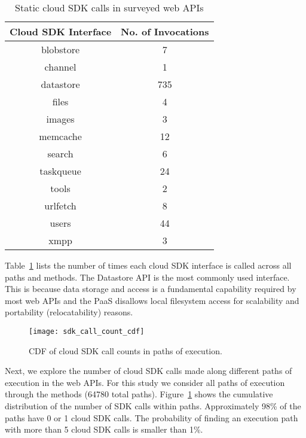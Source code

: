 \begin{table}[htdp]
\caption{Static cloud SDK calls in surveyed web APIs
\label{tab:sdk_call_counts}
}
\begin{center}
\begin{tabular}{|c|c|}
\hline
Cloud SDK Interface & No. of Invocations \\ \hline
blobstore & 7 \\ \hline
channel & 1 \\ \hline
datastore & 735 \\ \hline
files & 4 \\ \hline
images & 3 \\ \hline
memcache & 12 \\ \hline
search & 6 \\ \hline
taskqueue & 24 \\ \hline
tools & 2 \\ \hline
urlfetch & 8 \\ \hline
users & 44 \\ \hline
xmpp & 3 \\ \hline
\end{tabular}
\end{center}
\vspace{-0.2in}
\end{table}

Table~\ref{tab:sdk_call_counts} lists the number of times each cloud 
SDK interface is called across all paths and methods.
The Datastore API is the most commonly used interface.
This is because data storage and access is a fundamental 
capability required by most web APIs and the PaaS
disallows local filesystem
access for scalability and portability (relocatability) reasons.

\begin{figure}
\centering
\texttt{[image: sdk\_call\_count\_cdf]}
\caption{CDF of cloud SDK call counts in paths of execution.
\label{fig:sdk_call_count_cdf}
}
\vspace{-0.2in}
\end{figure}

Next, we explore the number of cloud SDK calls made along 
different paths of execution in the web APIs. For this study
we consider all paths of execution through the methods (64780 total paths). 
Figure~\ref{fig:sdk_call_count_cdf}
shows the cumulative distribution of the number of SDK calls within paths.
Approximately 98\% of the paths have 0 or 1 cloud SDK calls. 
The probability of finding an execution path with more than
5 cloud SDK calls is smaller than 1\%.

